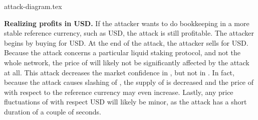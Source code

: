 {attack-diagram.tex}

\noindent
\textbf{Realizing profits in USD.}
If the attacker wants to do bookkeeping in a more stable reference currency,
such as USD, the attack is still profitable. The attacker begins by buying
\asset for USD. At the end of the attack, the attacker sells \asset for USD.
Because the attack concerns a particular liquid staking protocol, and
not the whole \asset network, the price of \asset will likely not
be significantly affected by the attack at all.
This attack decreases the market confidence in \stasset,
but not in \asset.
In fact, because
the attack causes slashing of \asset, the supply of \asset is decreased
and the price of \asset with respect to the reference currency may
even increase.
Lastly, any price fluctuations of \asset with respect USD will likely be
minor, as the attack has a short duration of a couple of seconds.
